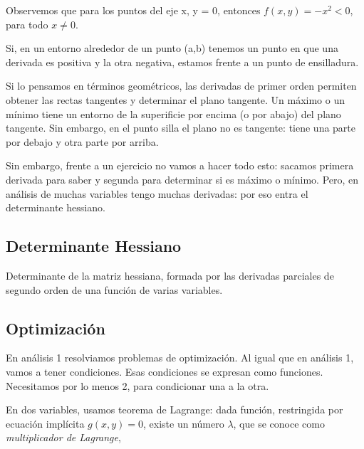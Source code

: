 Observemos que para los puntos del eje x, y = 0, entonces \(f(x,y) = -x^2 < 0\),
para todo \(x \neq 0\).

Si, en un entorno alrededor de un punto (a,b)
tenemos un punto en que una derivada es positiva y la otra negativa,
estamos frente a un punto de ensilladura.

Si lo pensamos en términos geométricos, las derivadas de primer orden
permiten obtener las rectas tangentes y determinar el plano tangente.
Un máximo o un mínimo tiene un entorno de la superificie por encima (o por abajo)
del plano tangente.
Sin embargo, en el punto silla el plano no es tangente:
tiene una parte por debajo y otra parte por arriba.

Sin embargo, frente a un ejercicio no vamos a hacer todo esto:
sacamos primera derivada para saber y segunda para determinar si es máximo o mínimo.
Pero, en análisis de muchas variables tengo muchas derivadas:
por eso entra el determinante hessiano.

\subsection{Determinante Hessiano}

Determinante de la matriz hessiana, formada por las derivadas parciales de segundo orden de una función de varias variables.

\subsection{Optimización}

En análisis 1 resolviamos problemas de optimización.
Al igual que en análisis 1, vamos a tener condiciones.
Esas condiciones se expresan como funciones.
Necesitamos por lo menos 2,
para condicionar una a la otra.

En dos variables, usamos teorema de Lagrange:
dada función,
restringida por ecuación implícita \(g(x,y)=0\),
existe un número \(\lambda\),
que se conoce como \textit{multiplicador de Lagrange},
